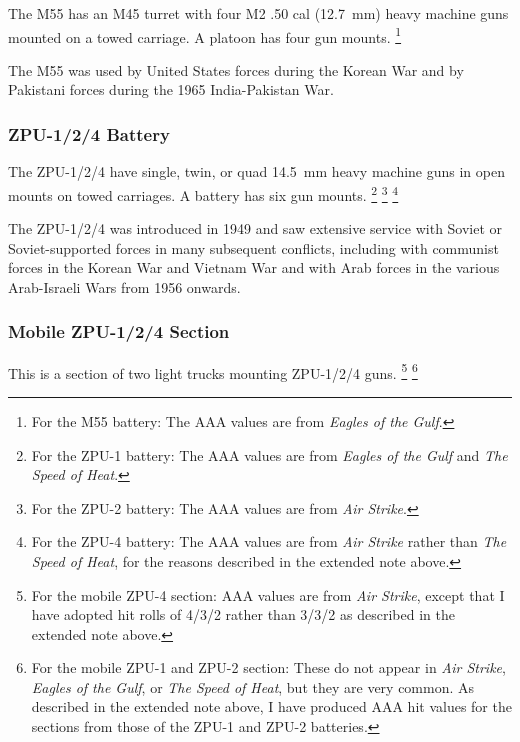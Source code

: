 \documentclass[10pt]{article}
\newcommand{\note}[1]{%
    \footnote{%
        \setlength{\parindent}{0pt}%
        \setlength{\parskip}{\smallskipamount}%
        #1
    }%
}
\begin{document}
The M55 has an M45 turret with four M2 .50 cal (12.7~mm) heavy machine guns mounted on a towed carriage. A platoon has four gun mounts.%
\note{
    For the M55 battery: The AAA values are from \emph{Eagles of the Gulf}.
}

The M55 was used by United States forces during the Korean War and by Pakistani forces during the 1965 India-Pakistan War.


\subsubsection{ZPU-1/2/4 Battery}

The ZPU-1/2/4 have single, twin, or quad 14.5~mm heavy machine guns in open mounts on towed carriages. A battery has six gun mounts.%
\note{
    For the ZPU-1 battery: The AAA values are from \emph{Eagles of the Gulf} and \emph{The Speed of Heat}.
}%
\note{
    For the ZPU-2 battery: The AAA values are from \emph{Air Strike}.
}%
\note{
    For the ZPU-4 battery: The AAA values are from \emph{Air Strike} rather than \emph{The Speed of Heat}, for the reasons described in the extended note above.
}

The ZPU-1/2/4 was introduced in 1949 and saw extensive service with Soviet or Soviet-supported forces in many subsequent conflicts, including with communist forces in the Korean War and Vietnam War and with Arab forces in the various Arab-Israeli Wars from 1956 onwards.

\subsubsection{Mobile ZPU-1/2/4 Section}

This is a section of two light trucks mounting ZPU-1/2/4 guns.%
\note{
    For the mobile ZPU-4 section:
    AAA values are from \emph{Air Strike}, except that I have adopted hit rolls of 4/3/2 rather than 3/3/2 as described in the extended note above.
}%
\note{
    For the mobile ZPU-1 and ZPU-2 section: These do not appear in \emph{Air Strike}, \emph{Eagles of the Gulf}, or \emph{The Speed of Heat}, but they are very common. As described in the extended note above, I have produced AAA hit values for the sections from those of the ZPU-1 and ZPU-2 batteries.
}
\end{document}
